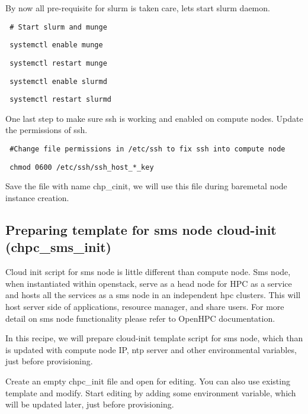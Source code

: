 \documentclass[12pt]{article}
\begin{document}
By now all pre-requisite for slurm is taken care, lets start slurm daemon.

\begin{bash}\texttt{\small{ \# Start slurm and munge }}\end{bash}
\begin{bash}\texttt{\small{ systemctl enable munge}}\end{bash}
\begin{bash}\texttt{\small{ systemctl restart munge}}\end{bash}
\begin{bash}\texttt{\small{ systemctl enable slurmd}}\end{bash}
\begin{bash}\texttt{\small{ systemctl restart slurmd}}\end{bash}

One last step to make sure ssh is working and enabled on compute nodes. Update the permissions of ssh.

\begin{bash}\texttt{\small{ \#Change file permissions in /etc/ssh to fix ssh into compute node}}\end{bash}
\begin{bash}\texttt{\small{ chmod 0600 /etc/ssh/ssh\_host\_*\_key}}\end{bash}

Save the file with name chp\_cinit, we will use this file during baremetal node instance creation.

\subsection[]{Preparing template for sms node cloud-init (chpc\_sms\_init)}

Cloud init script for sms node is little different than compute node. Sms node, when instantiated within openstack, serve as a head node for HPC as a service and hosts all the services as a sms node in an independent hpc clusters. This will host server side of applications, resource manager, and share users. For more detail on sms node functionality please refer to OpenHPC documentation.

In this recipe, we will prepare cloud-init template script for sms node, which than is updated with compute node IP, ntp server and other environmental variables, just before provisioning. 

Create an empty chpc\_init file and open for editing. You can also use existing template and modify. Start editing by adding some environment variable, which will be updated later, just before provisioning.
\end{document}
